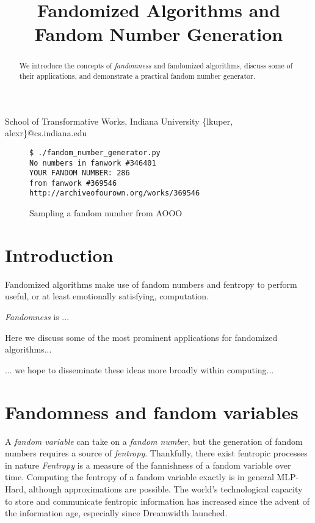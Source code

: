 \documentclass[9pt]{sigplanconf}
\begin{document}
\title{Fandomized Algorithms and Fandom Number Generation}

           {School of Transformative Works, Indiana University}
           {\{lkuper, alexr\}@cs.indiana.edu}

\maketitle

\begin{abstract}
We introduce the concepts of \emph{fandomness} and fandomized algorithms,
discuss some of their applications, and demonstrate a practical fandom number
generator.
\end{abstract}

\begin{figure}[bl]
\begin{verbatim}
$ ./fandom_number_generator.py 
No numbers in fanwork #346401
YOUR FANDOM NUMBER: 286
from fanwork #369546
http://archiveofourown.org/works/369546
\end{verbatim}
\caption{Sampling a fandom number from AOOO}
\end{figure}

\section{Introduction}
Fandomized algorithms make use of fandom numbers and fentropy to perform
useful, or at least emotionally satisfying, computation.

\emph{Fandomness} is ...

Here we discuss some of the most prominent applications for fandomized
algorithms...

... we hope to disseminate these ideas more broadly within computing...


\section{Fandomness and fandom variables}
A \emph{fandom variable} can take on a \emph{fandom number}, but the generation
of fandom numbers requires a source of \emph{fentropy}. Thankfully, there exist
fentropic processes in nature \emph{Fentropy} is a measure of the fannishness
of a fandom variable over time.  Computing the fentropy of a fandom variable
exactly is in general MLP-Hard, although approximations are possible.  The
world's technological capacity to store and communicate fentropic information
has increased since the advent of the information age, especially since
Dreamwidth launched.
\end{document}
